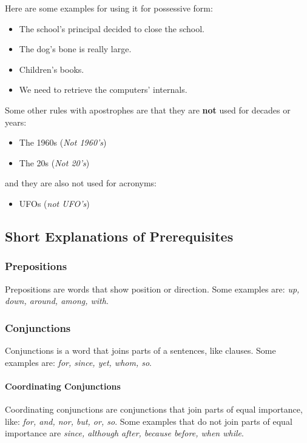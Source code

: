 Here are some examples for using it for possessive form:

\begin{itemize}
    \item The school's principal decided to close the school.
    \item The dog's bone is really large.
    \item Children's books.
    \item We need to retrieve the computers' internals.
\end{itemize}

Some other rules with apostrophes are that they are \textbf{not} used for decades or years:

\begin{itemize}
    \item The 1960s (\textit{Not 1960's})
    \item The 20s (\textit{Not 20's})
\end{itemize}

and they are also not used for acronyms:

\begin{itemize}
    \item UFOs (\textit{not UFO's})
\end{itemize}

\newpage
\subsection{Short Explanations of Prerequisites}
\subsubsection{Prepositions}
Prepositions are words that show position or direction. Some examples are: \textit{up, down, around, among, with}.

\subsubsection{Conjunctions}
\label{Conjunctions}
Conjunctions is a word that joins parts of a sentences, like clauses. Some examples are: \textit{for, since, yet, whom, so}.
\paragraph{Coordinating Conjunctions}
Coordinating conjunctions are conjunctions that join parts of equal importance, like: \textit{for, and, nor, but, or, so}. Some examples that do not join parts of equal importance are \textit{since, although after, because before, when while}.

